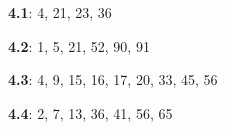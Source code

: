\documentclass{siproblemset}
\begin{document}
        \textbf{4.1}: 4, 21, 23, 36
        
        \textbf{4.2}: 1, 5, 21, 52, 90, 91
        
        \textbf{4.3}: 4, 9, 15, 16, 17, 20, 33, 45, 56
        
        \textbf{4.4}: 2, 7, 13, 36, 41, 56, 65
        
%        
%        
%        
%        
%        
%        
%        
%        
%        
%        
%        
    
\end{document}
